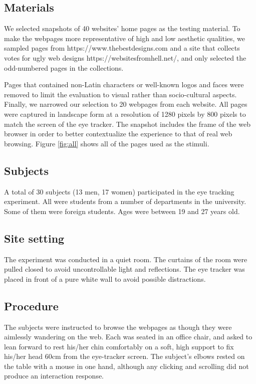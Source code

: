 \subsection{Materials}
We selected snapshots of 40 websites' home pages as the testing material. To make the webpages more representative of high and low aesthetic qualities, we sampled pages from https://www.thebestdesigns.com and a site that collects votes for ugly web designs https://websitesfromhell.net/, and only selected the odd-numbered pages in the collections.

Pages that contained non-Latin characters or well-known logos and faces were removed to limit the evaluation to visual rather than socio-cultural aspects. Finally, we narrowed our selection to 20 webpages from each website. All pages were captured in landscape form at a resolution of 1280 pixels by 800 pixels to match the screen of the eye tracker.
The snapshot includes the frame of the web browser in order to better contextualize the experience to that of real web browsing.
Figure \ref{fig:all} shows all of the pages used as the stimuli.

\subsection{Subjects}
A total of 30 subjects (13 men, 17 women) participated in the eye tracking experiment. All were students from a number of departments in the university. Some of them were foreign students. Ages were between 19 and 27 years old.

\subsection{Site setting}
The experiment was conducted in a quiet room. The curtains of the room were pulled closed to avoid uncontrollable light and reflections.
The eye tracker was placed in front of a pure white wall to avoid possible distractions.

\subsection{Procedure}
The subjects were instructed to browse the webpages as though they were aimlessly wandering on the web. Each was seated in an office chair, and asked to lean forward to rest his/her chin comfortably on a soft, high support to fix his/her head 60cm from the eye-tracker screen. The subject's elbows rested on the table with a mouse in one hand, although any clicking and scrolling did not produce an interaction response.

